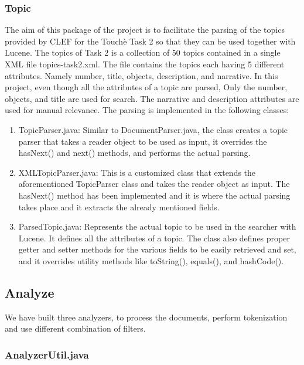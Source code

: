 \subsubsection{Topic}
        
            The aim of this package of the project is to facilitate the parsing of the topics provided by CLEF for the Touchè Task 2 so that they can be used together with Lucene. The topics of Task 2 is a collection of 50 topics contained in a single XML file topics-task2.xml. The file contains the topics each having 5 different attributes. Namely number, title, objects, description, and narrative. In this project, even though all the attributes of a topic are parsed, Only the number, objects, and title are used for search. The narrative and description attributes are used for manual relevance. The parsing is implemented in the following classes:
            \begin{enumerate}
                \item 
                    TopicParser.java: Similar to DocumentParser.java, the class creates a     topic parser that takes a reader object to be used as input, it overrides the hasNext() and next() methods, and performs the actual parsing.
                \item 
                    XMLTopicParser.java: This is a customized class that  extends the aforementioned TopicParser class and takes the reader object as input. The hasNext() method has been implemented and it is where the actual parsing takes place and it extracts the already mentioned fields.
                \item
                    ParsedTopic.java: Represents the actual topic to be used in the searcher with Lucene. It defines all the attributes of a topic. The class also defines proper getter and setter methods for the various fields to be easily retrieved and set, and it overrides utility methods like toString(), equals(), and hashCode().
            \end{enumerate}
\subsection{Analyze}
  
    We have built three analyzers, to process the documents, perform tokenization and use different combination of filters.
\subsubsection{AnalyzerUtil.java}
            
